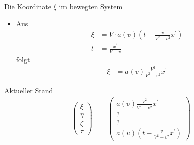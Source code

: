 \documentclass[]{beamer}%
\begin{document}
\begin{frame}{Die Koordinate $\xi$ im bewegten System}
    \begin{itemize}
        \item Aus
            \begin{align*}
                \xi     &=  V \cdot a\left(v\right) \left(
                                t-\frac{v}{V^2-v^2} x^\prime
                            \right)\\
                t   &=   \frac{x^\prime}{V-v}
            \end{align*}
            folgt
            \begin{align*}
                \xi     &=   a\left(v\right) 
                                \frac{V^2}{V^2-v^2} x^\prime
            \end{align*}
    \end{itemize}
\end{frame}

\begin{frame}{Aktueller Stand}
    \begin{align*}
        \begin{pmatrix}
            \xi \\ 
            \eta \\ 
            \zeta\\ 
            \tau 
        \end{pmatrix}
    &=
        \begin{pmatrix}
            a\left(v\right) \frac{V^2}{V^2-v^2} x^\prime\\
            ? \\ 
            ? \\ 
            a\left( v \right) 
                \left( 
                    t-\tfrac{v}{V^2-v^2} x^\prime
                \right)
        \end{pmatrix}\\
    \end{align*}
\end{frame}
\end{document}
